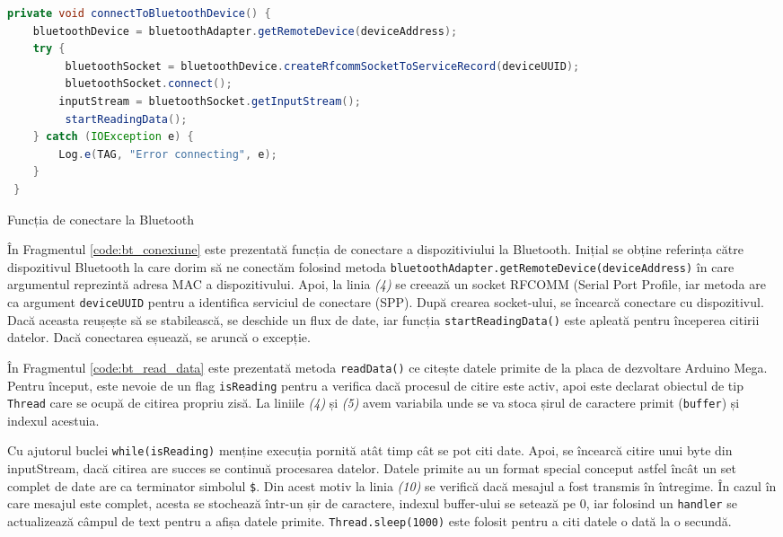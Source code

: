 \begin{code}[H]
\begin{lstlisting}[language=Java]
private void connectToBluetoothDevice() {
    bluetoothDevice = bluetoothAdapter.getRemoteDevice(deviceAddress);
    try {
         bluetoothSocket = bluetoothDevice.createRfcommSocketToServiceRecord(deviceUUID);
         bluetoothSocket.connect();
        inputStream = bluetoothSocket.getInputStream();
         startReadingData();
    } catch (IOException e) {
        Log.e(TAG, "Error connecting", e);
    }
 }
\end{lstlisting}
\caption{Funcția de conectare la Bluetooth \cite{bt_api}}
\label{code:bt_conexiune}
\end{code}

În Fragmentul \ref{code:bt_conexiune} este prezentată funcția de conectare a dispozitiviului la Bluetooth. Inițial se obține referința către dispozitivul Bluetooth la care dorim să ne conectăm folosind metoda \texttt{bluetoothAdapter.getRemoteDevice(deviceAddress)} în care argumentul reprezintă adresa MAC a dispozitivului. Apoi, la linia \textit{(4)} se creează un socket RFCOMM (Serial Port Profile, iar metoda are ca argument \texttt{deviceUUID} pentru a identifica serviciul de conectare (SPP). După crearea socket-ului, se încearcă conectare cu dispozitivul. Dacă aceasta reușește să se stabilească, se deschide un flux de date, iar funcția \texttt{startReadingData()} este apleată pentru începerea citirii datelor. Dacă conectarea eșuează, se aruncă o excepție.

În Fragmentul \ref{code:bt_read_data} este prezentată metoda \texttt{readData()} ce citește datele primite de la placa de dezvoltare Arduino Mega. Pentru început, este nevoie de un flag \texttt{isReading} pentru a verifica dacă procesul de citire este activ, apoi este declarat obiectul de tip \texttt{Thread} care se ocupă de citirea propriu zisă. La liniile \textit{(4)} și \textit{(5)} avem variabila unde se va stoca șirul de caractere primit (\texttt{buffer}) și indexul acestuia. 

Cu ajutorul buclei \texttt{while(isReading)} menține execuția pornită atât timp cât se pot citi date. Apoi, se încearcă citire unui byte din inputStream, dacă citirea are succes se continuă procesarea datelor. Datele primite au un format special conceput astfel încât un set complet de date are ca terminator simbolul \texttt{\$}. Din acest motiv la linia \textit{(10)} se verifică dacă mesajul a fost transmis în întregime. În cazul în care mesajul este complet, acesta se stochează într-un șir de caractere, indexul buffer-ului se setează pe 0, iar folosind un \texttt{handler} se actualizează câmpul de text pentru a afișa datele primite. \texttt{Thread.sleep(1000)} este folosit pentru a citi datele o dată la o secundă. 


